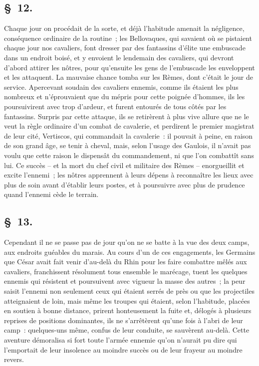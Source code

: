 \documentclass[french,twoside]{book} %
\begin{document}
\subsection[{§ 12.}]{ \textsc{§ 12.} }
\noindent Chaque jour on procédait de la sorte, et déjà l’habitude amenait la négligence, conséquence ordinaire de la routine ; les Bellovaques, qui savaient où se pistaient chaque jour nos cavaliers, font dresser par des fantassins d’élite une embuscade dans un endroit boisé, et y envoient le lendemain des cavaliers, qui devront d’abord attirer les nôtres, pour qu’ensuite les gens de l’embuscade les enveloppent et les attaquent. La mauvaise chance tomba sur les Rèmes, dont c’était le jour de service. Apercevant soudain des cavaliers ennemis, comme ils étaient les plus nombreux et n’éprouvaient que du mépris pour cette poignée d’hommes, ils les poursuivirent avec trop d’ardeur, et furent entourés de tous côtés par les fantassins. Surpris par cette attaque, ils se retirèrent à plus vive allure que ne le veut la règle ordinaire d’un combat de cavalerie, et perdirent le premier magistrat de leur cité, Vertiscos, qui commandait la cavalerie : il pouvait à peine, en raison de son grand âge, se tenir à cheval, mais, selon l’usage des Gaulois, il n’avait pas voulu que cette raison le dispensât du commandement, ni que l’on combattît sans lui. Ce succès – et la mort du chef civil et militaire des Rèmes – enorgueillit et excite l’ennemi ; les nôtres apprennent à leurs dépens à reconnaître les lieux avec plus de soin avant d’établir leurs postes, et à poursuivre avec plus de prudence quand l’ennemi cède le terrain.
\subsection[{§ 13.}]{ \textsc{§ 13.} }
\noindent Cependant il ne se passe pas de jour qu’on ne se batte à la vue des deux camps, aux endroits guéables du marais. Au cours d’un de ces engagements, les Germains que César avait fait venir d’au-delà du Rhin pour les faire combattre mêlés aux cavaliers, franchissent résolument tous ensemble le marécage, tuent les quelques ennemis qui résistent et poursuivent avec vigueur la masse des autres ; la peur saisit l’ennemi non seulement ceux qui étaient serrés de près ou que les projectiles atteignaient de loin, mais même les troupes qui étaient, selon l’habitude, placées en soutien à bonne distance, prirent honteusement la fuite et, délogés à plusieurs reprises de positions dominantes, ils ne s’arrêtèrent qu’une fois à l’abri de leur camp : quelques-uns même, confus de leur conduite, se sauvèrent au-delà. Cette aventure démoralisa si fort toute l’armée ennemie qu’on n’aurait pu dire qui l’emportait de leur insolence au moindre succès ou de leur frayeur au moindre revers.
\end{document}
